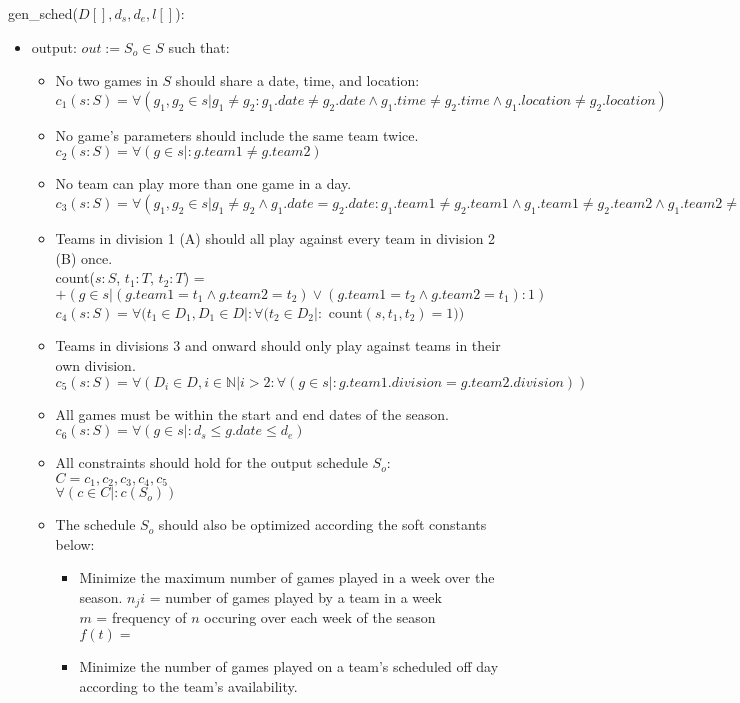 \documentclass[12pt, titlepage]{article}
\begin{document}
\noindent gen\_sched($D[], d_s, d_e, l[]$):
\begin{itemize}
\item output: $out := S_o \in S$ such that:
\begin{itemize}
  \item No two games in $S$ should share a date, time, and location:\\
  $c_1(s:S) = \forall(g_1, g_2 \in s | g_1 \neq g_2 : g_1.date \neq
  g_2.date \land g_1.time \neq g_2.time \land g_1.location \neq g_2.location)$
  \item No game's parameters should include the same team twice.\\
  $c_2(s:S) = \forall (g \in s |: g.team1 \neq g.team2)$
  \item No team can play more than one game in a day.\\
  $c_3(s:S) = \forall (g_1, g_2 \in s |g_1 \neq g_2 \land g_1.date =
  g_2.date : g_1.team1 \neq g_2.team1 \land g_1.team1 \neq g_2.team2 \land
  g_1.team2 \neq g_2.team1 \land g_1.team2 \neq g_2.team2)$
  \item Teams in division 1 (A) should all play against every team in division
  2 (B) once.\\
  count($s:S$, $t_1:T$, $t_2:T$) = $+(g \in s | (g.team1 = t_1 \land
  g.team2 = t_2) \lor (g.team1 = t_2 \land g.team2 = t_1) : 1)$\\
  $c_4(s:S) = \forall (t_1 \in D_1, D_1 \in D |: \forall (t_2 \in D_2 |:$ count$(s, t_1,
  t_2) = 1))$
  \item Teams in divisions 3 and onward should only play against teams in
  their own division.\\
  $c_5(s:S) = \forall (D_i \in D, i \in \mathbb{N} | i > 2 : \forall (g \in s |:
  g.team1.division = g.team2.division))$
  \item All games must be within the start and end dates of the season.\\
  $c_6(s:S) = \forall (g \in s |: d_s \leq g.date \leq d_e)$
  \item All constraints should hold for the output schedule $S_o$:\\
  $C = {c_1, c_2, c_3, c_4, c_5}$\\
  $\forall(c \in C |: c(S_o))$
  \item The schedule $S_o$ should also be optimized according the soft
  constants below:
  \begin{itemize}
    \item Minimize the maximum number of games played in a week over the
    season.
    $n_ji$ = number of games played by a team in a week\\
    $m$ = frequency of $n$ occuring over each week of the season\\
    $f(t) = $
    \item Minimize the number of games played on a team's scheduled off day
    according to the team's availability.
  \end{itemize}
\end{itemize}
\end{itemize}
\end{document}
